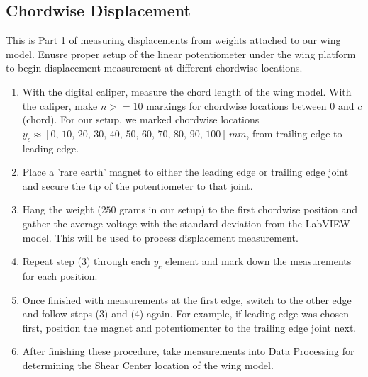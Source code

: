 \documentclass{article}
\begin{document}
\subsection{Chordwise Displacement}
This is Part 1 of measuring displacements from weights attached to our wing model. Enusre proper setup of the linear potentiometer under the wing platform to begin displacement measurement at different chordwise locations.
\begin{enumerate}
  \item With the digital caliper, measure the chord length of the wing model. With the caliper, make $n>=10$ markings for chordwise locations between $0$ and $c$ (chord). For our setup, we marked chordwise locations $y_{c} \approx \left[0,\, 10,\, 20,\, 30,\, 40,\, 50,\, 60,\, 70,\, 80,\, 90,\, 100\right]\, mm$, from trailing edge to leading edge.
  \vspace{2.5mm}
  
  \item Place a 'rare earth' magnet to either the leading edge or trailing edge joint and secure the tip of the potentiometer to that joint.
  \vspace{2.5mm}

  \item Hang the weight ($250$ grams in our setup) to the first chordwise position and gather the average voltage with the standard deviation from the LabVIEW model. This will be used to process displacement measurement.
  \vspace{2.5mm}

  \item Repeat step (3) through each $y_{c}$ element and mark down the measurements for each position.
  \vspace{2.5mm}

  \item Once finished with measurements at the first edge, switch to the other edge and follow steps (3) and (4) again. For example, if leading edge was chosen first, position the magnet and potentiomenter to the trailing edge joint next.
  \vspace{2.5mm}

  \item After finishing these procedure, take measurements into Data Processing for determining the Shear Center location of the wing model.
\end{enumerate}
\end{document}
